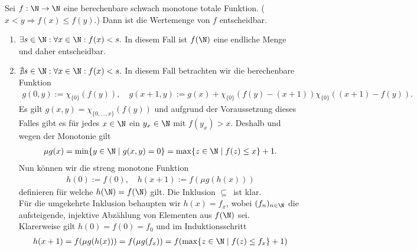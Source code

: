 
\begin{exercise}[215]

\phantom{}

	Sei $f:\N \to \N$ eine berechenbare schwach monotone totale Funktion. ($x < y \Rightarrow f(x) \leq f(y)$.) Dann ist die Wertemenge von $f$ entscheidbar.

\end{exercise}


\begin{solution}

\phantom{}

	\begin{enumerate}[label = Fall \arabic*:]
		\item $\exists s \in \N: \forall x \in \N: f(x) < s.$ In diesem Fall ist $f(\N)$ eine endliche Menge und daher entscheidbar.
		\item $\nexists s \in \N: \forall x \in \N: f(x) < s.$ In diesem Fall betrachten wir die berechenbare Funktion
			\begin{align*}
			g(0,y) := \chi_{\{0\}}(f(y)), \quad g(x + 1, y) := g(x) + \chi_{\{0\}}(f(y) - (x + 1)) \chi_{\{0\}}((x + 1) - f(y)).
			\end{align*}
			Es gilt $g(x,y) = \chi_{\{0, \dots, x\}}(f(y))$ und aufgrund der Voraussetzung dieses Falles gibt es für jedes $x \in \N$ ein $y_x \in \N$ mit $f(y_x) > x$. Deshalb und wegen der Monotonie gilt
			\begin{align*}
			\mu g(x) = \min\{y \in \N \mid g(x,y) = 0\} = \max\{z \in \N \mid f(z) \leq x\} + 1.
			\end{align*}
			Nun können wir die streng monotone Funktion
			\begin{align*}
			h(0) := f(0), \quad h(x + 1) := f(\mu g(h(x)))
			\end{align*}
			definieren für welche $h(\N) = f(\N)$ gilt. Die Inklusion \glqq$\subseteq$\grqq\ ist klar. \\
			Für die umgekehrte Inklusion behaupten wir $h(x) = f_x$, wobei $(f_n)_{n \in \N}$
			die aufsteigende, injektive Abzählung von Elementen aus $f(\N)$ sei. \\
			Klarerweise gilt $h(0) = f(0) = f_0$ und im Induktionsschritt
			\begin{align*}
				h(x + 1) = f(\mu g(h(x))) = f(\mu g(f_x)) = f(\max\{z \in \N \mid f(z) \leq f_x\} + 1)

\end{align*}
\end{enumerate}
\end{solution}
